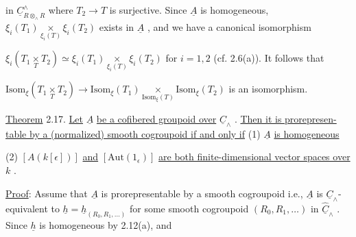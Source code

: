 \begin{center}
\end{center}
in  $\underline{C}^{\wedge}_{R \otimes_{\wedge} R}$  where  $T_{2} \longrightarrow T$  is surjective. Since  $\underline{A}$  is homogeneous, $\xi_{i}(T_{1}) \underset{\xi_{i}(T)}{\times} \xi_{i}(T_{2})$  exists in  $\underline{A}$  , and we have a canonical isomorphism

$\xi_{i}(T_{1} \underset{T}{\times} T_{2}) \simeq \xi_{i}(T_{1}) \underset{\xi_{i}(T)}{\times} \xi_{i}(T_{2})$  for  $i = 1,2$  (cf. 2.6(a)). It follows that

$\mathrm{Isom}_{\xi}(T_{1} \underset{T}{\times} T_{2}) \longrightarrow \mathrm{Isom}_{\xi}(T_{1}) \underset{\mathrm{Isom}_{\xi}(T)}{\times} \mathrm{Isom}_{\xi}(T_{2})$  is an isomorphism.

\underline{Theorem} 2.17.  \underline{Let}  $\underline{A}$  \underline{be a cofibered groupoid over}  $\underline{C}_{\wedge}$  . \underline{Then it is prorepresen-table by a (normalized) smooth cogroupoid if and only if}
(1)  $\underline{A}$  \underline{is homogeneous}

(2)  $[A(k[\epsilon])]$  \underline{and}  $[\mathrm{Aut}(1_{\epsilon})]$  \underline{are both finite-dimensional vector spaces over}  $k$  .

\underline{Proof}:  Assume that  $\underline{A}$  is prorepresentable by a smooth cogroupoid i.e.,  $\underline{A}$  is  $\underline{C}_{\wedge}$-equivalent to  $\underline{h} = \underline{h}_{(R_{0},R_{1},\ldots)}$  for some smooth cogroupoid  $(R_{0},R_{1},\ldots)$  in  $\hat{\underline{C}}_{\wedge}$  . Since  $\underline{h}$  is homogeneous by 2.12(a), and


